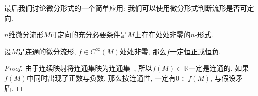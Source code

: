 最后我们讨论微分形式的一个简单应用: 我们可以使用微分形式判断流形是否可定向.

\begin{prop}\label{orientable and n-form}
    $n$维微分流形$M$可定向的充分必要条件是$M$上存在处处非零的$n$-形式.
\end{prop}

\begin{lem}\label{nowhere vanish}
    设$M$是连通的微分流形, $f\in C^\infty(M)$处处非零, 那么$f$一定恒正或恒负.
\end{lem}
\begin{proof}
    由于连续映射将连通集映为连通集~\Parencite[定理4.7]{Lee_IntroTopoMani}, 所以$f(M)\subset\mathbb{R}$一定是连通的.
    如果$f(M)$中同时出现了正数与负数, 那么按连通性, 一定有$0\in f(M)$, 与假设矛盾.
\end{proof}


